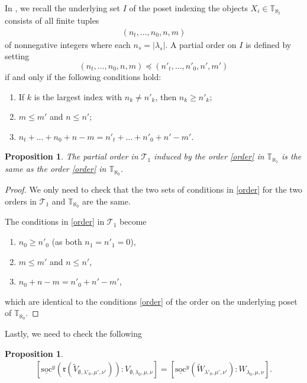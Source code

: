 \documentclass[openany, a4paper]{amsbook}
\newtheorem{prop}[thm]{Proposition}
\theoremstyle{definition}
\numberwithin{equation}{chapter}
\newcommand{\T}[1]{{\mathbb{T}}_{\aleph_{#1}}}
\newcommand{\socl}[2]{\underline{\mathrm{soc}}^{#1}({#2})}
\begin{document}
In \cite{cp17}, we recall the underlying set $I$ of the poset indexing the objects $X_i \in \T{t}$ consists of all finite tuples 
\begin{align*}
    (n_{t}, ..., n_{0}, n, m)
\end{align*} 
of nonnegative integers where each $n_{s} = \left\lvert \lambda_s \right\rvert $. A partial order on $I$ is defined by setting
    \begin{equation}\label{order}
        (n_{t}, ..., n_{0}, n, m) \preceq (n'_{t}, ..., n'_{0}, n', m')
    \end{equation}
    if and only if the following conditions hold:
    \begin{enumerate}[label=\textbf{C.\arabic*}]
        \item If $k$ is the largest index with $n_k \neq n'_k$, then $n_k \geq n'_k$;
        \item $m \leq m'$ and $n \leq n'$;
        \item $n_t + ... + n_0 + n - m = n'_t + ... + n'_0 + n' - m'$.
    \end{enumerate}


\begin{prop}
    The partial order in $\mathcal{T}_1$ induced by the order \eqref{order} in $\T{1}$ is the same as the order \eqref{order} in $\T{0}$.
\end{prop}

\begin{proof}
    We only need to check that the two sets of conditions in \eqref{order} for the two orders in $\mathcal{T}_1$ and $\T{0}$ are the same.

    The conditions in \eqref{order} in $\mathcal{T}_1$ become
    \begin{enumerate}[label=\textbf{D.\arabic*}]
        \item $n_0 \geq n'_0$ (as both $n_1= n'_1 =0$),
        \item $m \leq m'$ and $n \leq n'$,
        \item $n_0 + n - m = n'_0 + n' - m'$,
    \end{enumerate}
    which are identical to the conditions \eqref{order} of the order on the underlying poset of $\T{0}$.
\end{proof}

Lastly, we need to check the following

\begin{prop}\label{soc rV W}
    \begin{align}
        \left[ \socl{y}{\mathfrak{r}(\tilde{ V}_{\emptyset, \lambda'_0, \mu', \nu'})} \colon V_{\emptyset, \lambda_0, \mu, \nu}  \right] = 
        \left[ \socl{y}{\tilde{W}_{\lambda'_0, \mu', \nu'}} \colon W_{\lambda_0, \mu, \nu}  \right].
    \end{align}
\end{prop}
\end{document}
